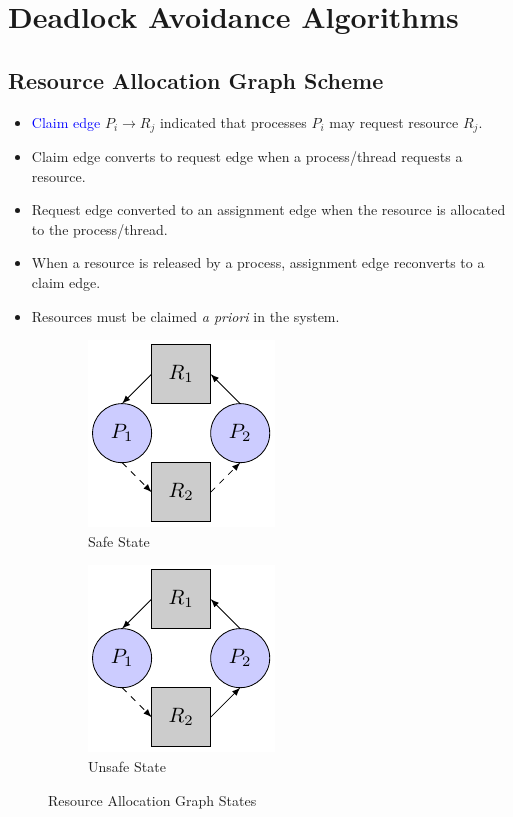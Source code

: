\documentclass[oneside]{book}
\begin{document}
        \section{Deadlock Avoidance Algorithms}
            \subsection{Resource Allocation Graph Scheme}
                \begin{itemize}
                    \item \textcolor{blue}{Claim edge} $P_i \rightarrow R_j$ indicated that processes $P_i$ may request resource
                    $R_j$.
                    \item Claim edge converts to request edge when a process/thread requests a resource.
                    \item Request edge converted to an assignment edge when the resource is allocated to the process/thread.
                    \item When a resource is released by a process, assignment edge reconverts to a claim edge.
                    \item Resources must be claimed \textit{a priori} in the system.
                \end{itemize}
                \begin{figure}[H]
                    \centering
                    \begin{subfigure}{0.5\linewidth}
                        \centering
                        \includegraphics{figures/resource_allocation_safe.pdf}
                        \caption{Safe State}
                    \end{subfigure}%
                    \begin{subfigure}{0.5\linewidth}
                        \centering
                        \includegraphics{figures/resource_allocation_unsafe.pdf}
                        \caption{Unsafe State}
                    \end{subfigure}
                    \caption{Resource Allocation Graph States}
                \end{figure}
\end{document}
